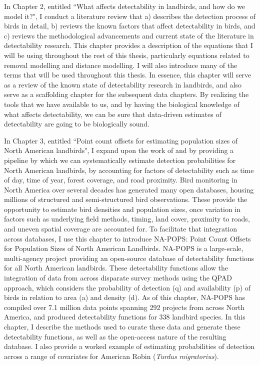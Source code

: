 \par In Chapter 2, entitled ``What affects detectability in landbirds, and how do we model it?", I conduct a literature review that a) describes the detection process of birds in detail, b) reviews the known factors that affect detectability in birds, and c) reviews the methodological advancements and current state of the literature in detectability research.
This chapter provides a description of the equations that I will be using throughout the rest of this thesis, particularly equations related to removal modelling and distance modelling.
I will also introduce many of the terms that will be used throughout this thesis.
In essence, this chapter will serve as a review of the known state of detectability research in landbirds, and also serve as a scaffolding chapter for the subsequent data chapters.
By realizing the tools that we have available to us, and by having the biological knowledge of what affects detectability, we can be sure that data-driven estimates of detectability are going to be biologically sound.


\par In Chapter 3, entitled ``Point count offsets for estimating population sizes of North American landbirds", I expand upon the work of \citet{solymos_calibrating_2013} and \citet{solymos_evaluating_2018} by providing a pipeline by which we can systematically estimate detection probabilities for North American landbirds, by accounting for factors of detectability such as time of day, time of year, forest coverage, and road proximity.
Bird monitoring in North America over several decades has generated many open databases, housing millions of structured and semi-structured bird observations. 
These provide the opportunity to estimate bird densities and population sizes, once variation in factors such as underlying field methods, timing, land cover, proximity to roads, and uneven spatial coverage are accounted for. 
To facilitate that integration across databases, I use this chapter to introduce NA-POPS: Point Count Offsets for Population Sizes of North American Landbirds. 
NA-POPS is a large-scale, multi-agency project providing an open-source database of detectability functions for all North American landbirds. 
These detectability functions allow the integration of data from across disparate survey methods using the QPAD approach, which considers the probability of detection (q) and availability (p) of birds in relation to area (a) and density (d). 
As of this chapter, NA-POPS has compiled over 7.1 million data points spanning 292 projects from across North America, and produced detectability functions for 338 landbird species. 
In this chapter, I describe the methods used to curate these data and generate these detectability functions, as well as the open-access nature of the resulting database. 
I also provide a worked example of estimating probabilities of detection across a range of covariates for American Robin (\textit{Turdus migratorius}).


